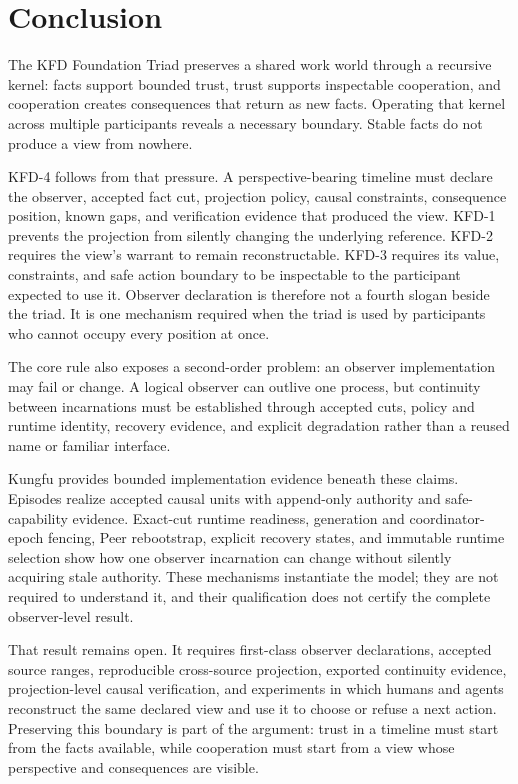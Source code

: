 \section{Conclusion}

The KFD Foundation Triad preserves a shared work world through a recursive
kernel: facts support bounded trust, trust supports inspectable cooperation,
and cooperation creates consequences that return as new facts. Operating that
kernel across multiple participants reveals a necessary boundary. Stable facts
do not produce a view from nowhere.

KFD-4 follows from that pressure. A perspective-bearing timeline must declare
the observer, accepted fact cut, projection policy, causal constraints,
consequence position, known gaps, and verification evidence that produced the
view. KFD-1 prevents the projection from silently changing the underlying
reference. KFD-2 requires the view's warrant to remain reconstructable. KFD-3
requires its value, constraints, and safe action boundary to be inspectable to
the participant expected to use it. Observer declaration is therefore not a
fourth slogan beside the triad. It is one mechanism required when the triad is
used by participants who cannot occupy every position at once.

The core rule also exposes a second-order problem: an observer implementation
may fail or change. A logical observer can outlive one process, but continuity
between incarnations must be established through accepted cuts, policy and
runtime identity, recovery evidence, and explicit degradation rather than a
reused name or familiar interface.

Kungfu provides bounded implementation evidence beneath these claims. Episodes
realize accepted causal units with append-only authority and safe-capability
evidence. Exact-cut runtime readiness, generation and coordinator-epoch
fencing, Peer rebootstrap, explicit recovery states, and immutable runtime
selection show how one observer incarnation can change without silently
acquiring stale authority. These mechanisms instantiate the model; they are
not required to understand it, and their qualification does not certify the
complete observer-level result.

That result remains open. It requires first-class observer declarations,
accepted source ranges, reproducible cross-source projection, exported
continuity evidence, projection-level causal verification, and experiments in
which humans and agents reconstruct the same declared view and use it to choose
or refuse a next action. Preserving this boundary is part of the argument:
trust in a timeline must start from the facts available, while cooperation must
start from a view whose perspective and consequences are visible.
